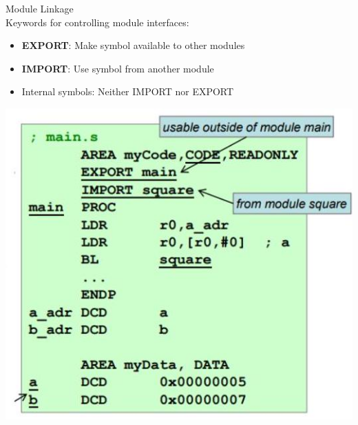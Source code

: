 \begin{definition}{Module Linkage}\\
Keywords for controlling module interfaces:
\begin{itemize}
  \item \textbf{EXPORT}: Make symbol available to other modules
  \item \textbf{IMPORT}: Use symbol from another module
  \item Internal symbols: Neither IMPORT nor EXPORT
\end{itemize}

\includegraphics[width=\linewidth]{images/2024_12_29_79e6b22f503fb7b4f718g-10(1)}
\end{definition}

